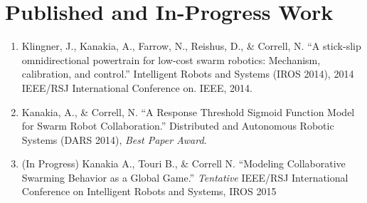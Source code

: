 \documentclass[11pt, onecolumn, compsoc, letterpaper]{article}
\begin{document}
\section{Published and In-Progress Work}
\begin{enumerate}
	\item Klingner, J., Kanakia, A., Farrow, N., Reishus, D., \& Correll, N. ``A stick-slip omnidirectional powertrain for low-cost swarm robotics: Mechanism, calibration, and control.'' Intelligent Robots and Systems (IROS 2014), 2014 IEEE/RSJ International Conference on. IEEE, 2014.
	\item Kanakia, A., \& Correll, N. ``A Response Threshold Sigmoid Function Model for Swarm Robot Collaboration.'' Distributed and Autonomous Robotic Systems (DARS 2014), \emph{Best Paper Award}.
	\item (In Progress) Kanakia A., Touri B., \& Correll N. ``Modeling Collaborative Swarming Behavior as a Global Game.''  \emph{Tentative} IEEE/RSJ International Conference on Intelligent Robots and Systems, IROS 2015
\end{enumerate}

%


\end{document}
